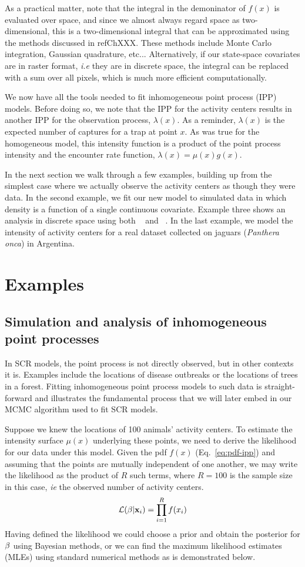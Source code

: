 As a practical matter, note that the integral in the
demoninator of $f(x)$ is evaluated over space, and since we almost always regard
space as two-dimensional, this is a two-dimensional integral that can
be approximated using the methods discussed in ref{ChXXX}. These methods include
Monte Carlo integration, Gaussian quadrature, etc... Alternatively, if
our state-space covariates are in raster format, \emph{i.e} they are
in discrete space, the integral can be replaced with a sum over
all pixels, which is much more efficient computationally.

We now have all the tools needed to fit inhomogeneous point process
(IPP) models. Before doing so, we note that the IPP for the activity centers
results in another IPP for the observation process, $\lambda(x)$. As
a reminder, $\lambda(x)$ is the expected number of captures for a trap
at point $x$. As was true for the homogeneous model, this
intensity function is a product of the point process intensity
and the encounter rate function, $\lambda(x) = \mu(x) g(x)$.

In the next section we walk through a few examples, building up from
the simplest case where we actually observe the activity centers as
though they were data. In the second example, we fit our new model to simulated
data in which density is a function of a single continuous
covariate. Example three shows an analysis in discrete space using
both \secr~\citep{efford:2011} and \jags~\citep{plummer:2003}. In the
last example, we model the intensity of
activity centers for a real dataset collected on jaguars
(\emph{Panthera onca}) in Argentina.

\section{Examples}

\subsection{Simulation and analysis of inhomogeneous point processes}

In SCR models, the point process is not directly observed, but in
other contexts it is.
Examples include the locations of disease
outbreaks or the locations of trees in a forest. Fitting inhomogeneous
point process models to such data is straight-forward and illustrates
the fundamental process that we will later embed in our MCMC algorithm
used to fit SCR models.

Suppose we knew the locations of 100 animals' activity
centers. To estimate the intensity surface $\mu(x)$ underlying these points, we
need to derive the likelihood for our data under this model. Given the
pdf $f(x)$ (Eq.~\ref{eq:pdf-ipp}) and assuming that the points are
mutually independent of one another, we may write
the likelihood as the product
of $R$ such terms, where $R=100$ is the sample size in this case,
\emph{ie} the observed number of activity centers.
\[
\mathcal{L}({\bf \beta} | {\bf x}_i) = \prod_{i=1}^R f(x_i)
\]
Having defined the likelihood we could choose a prior and obtain the posterior for
$\bf \beta$ using Bayesian methods, or we can find the maximum likelihood
estimates (MLEs) using standard numerical methods as is demonstrated
below.

